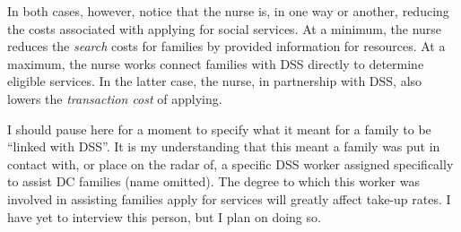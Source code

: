 \documentclass[12pt,letterpaperpaper,]{book}
\begin{document}
In both cases, however, notice that the nurse is, in one way or another,
reducing the costs associated with applying for social services. At a
minimum, the nurse reduces the \emph{search} costs for families by
provided information for resources. At a maximum, the nurse works
connect families with DSS directly to determine eligible services. In
the latter case, the nurse, in partnership with DSS, also lowers the
\emph{transaction cost} of applying.

I should pause here for a moment to specify what it meant for a family
to be ``linked with DSS''. It is my understanding that this meant a
family was put in contact with, or place on the radar of, a specific DSS
worker assigned specifically to assist DC families (name omitted). The
degree to which this worker was involved in assisting families apply for
services will greatly affect take-up rates. I have yet to interview this
person, but I plan on doing so.



\backmatter
\printindex
\end{document}
